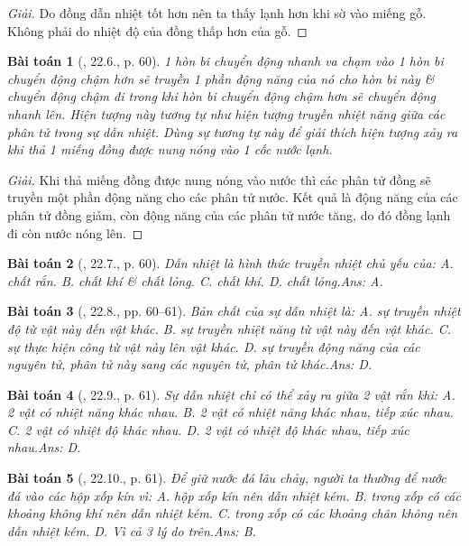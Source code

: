 \documentclass{article}
\newtheorem{baitoan}{Bài toán}
\begin{document}
\begin{proof}[Giải]
	Do đồng dẫn nhiệt tốt hơn nên ta thấy lạnh hơn khi sờ vào miếng gỗ. Không phải do nhiệt độ của đồng thấp hơn của gỗ.
\end{proof}

\begin{baitoan}[\cite{SBT_Vat_Ly_8}, 22.6., p. 60]
	1 hòn bi chuyển động nhanh va chạm vào 1 hòn bi chuyển động chậm hơn sẽ truyền 1 phần động năng của nó cho hòn bi này \& chuyển động chậm đi trong khi hòn bi chuyển động chậm hơn sẽ chuyển động nhanh lên. Hiện tượng này tương tự như hiện tượng truyền nhiệt năng giữa các phân tử trong sự dẫn nhiệt. Dùng sự tương tự này để giải thích hiện tượng xảy ra khi thả 1 miếng đồng được nung nóng vào 1 cốc nước lạnh.
\end{baitoan}

\begin{proof}[Giải]
	Khi thả miếng đồng được nung nóng vào nước thì các phân tử đồng sẽ truyền một phần động năng cho các phân tử nước. Kết quả là động năng của các phân tử đồng giảm, còn động năng của các phân tử nước tăng, do đó đồng lạnh đi còn nước nóng lên.
\end{proof}

\begin{baitoan}[\cite{SBT_Vat_Ly_8}, 22.7., p. 60]
	Dẫn nhiệt là hình thức truyền nhiệt chủ yếu của: {\sf A.} chất rắn. {\sf B.} chất khí \& chất lỏng. {\sf C.} chất khí. {\sf D.} chất lỏng.\hfill{\sf Ans: A.}
\end{baitoan}

\begin{baitoan}[\cite{SBT_Vat_Ly_8}, 22.8., pp. 60--61]
	Bản chất của sự dẫn nhiệt là: {\sf A.} sự truyền nhiệt độ từ vật này đến vật khác. {\sf B.} sự truyền nhiệt năng từ vật này đến vật khác. {\sf C.} sự thực hiện công từ vật này lên vật khác. {\sf D.} sự truyền động năng của các nguyên tử, phân tử này sang các nguyên tử, phân tử khác.\hfill{\sf Ans: D.}
\end{baitoan}

\begin{baitoan}[\cite{SBT_Vat_Ly_8}, 22.9., p. 61]
	Sự dẫn nhiệt chỉ có thể xảy ra giữa 2 vật rắn khi: {\sf A.} 2 vật có nhiệt năng khác nhau. {\sf B.} 2 vật có nhiệt năng khác nhau, tiếp xúc nhau. {\sf C.} 2 vật có nhiệt độ khác nhau. {\sf D.} 2 vật có nhiệt độ khác nhau, tiếp xúc nhau.\hfill{\sf Ans: D.}
\end{baitoan}

\begin{baitoan}[\cite{SBT_Vat_Ly_8}, 22.10., p. 61]
	Để giữ nước đá lâu chảy, người ta thường để nước đá vào các hộp xốp kín vì: {\sf A.} hộp xốp kín nên dẫn nhiệt kém. {\sf B.} trong xốp có các khoảng không khí nên dẫn nhiệt kém. {\sf C.} trong xốp có các khoảng chân không nên dẫn nhiệt kém. {\sf D.} Vì cả 3 lý do trên.\hfill{\sf Ans: B.}
\end{baitoan}
\end{document}
